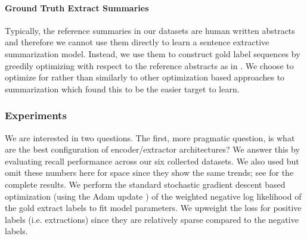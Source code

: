 \paragraph{Ground Truth Extract Summaries}
Typically, the reference summaries in our datasets are human written
abstracts and therefore we cannot use them directly to learn a sentence 
extractive summarization model.
Instead, we use them to construct gold label sequences
by greedily optimizing  with respect to the reference abstracts
as in \cite{nallapati2016summarunner}.
We choose to optimize for  rather than 
 similarly to other optimization based approaches to summarization 
\citep{sipos2012large,durrett2016learning,nallapati2016summarunner} 
which found this to be the easier target to learn.






\subsubsection{Experiments}

 We are interested in two questions. The first, more pragmatic question, is
 what are the best configuration of encoder/extractor architectures?
 We answer this by evaluating \rouge{} recall
performance across our six collected datasets.
 We also used \meteor{} 
\citep{denkowski:lavie:meteor-wmt:2014} but omit these numbers here
for space since they
show the same trends; see \cite{kedzie2018deep} for the complete results.
  We perform the standard
 stochastic gradient descent based optimization (using the Adam
 update \citep{kingma2014adam}) of the weighted negative log likelihood 
 of the gold extract labels to fit model parameters. We upweight the loss for positive labels (i.e.
 extractions) since they are relatively sparse compared to the negative 
 labels.


